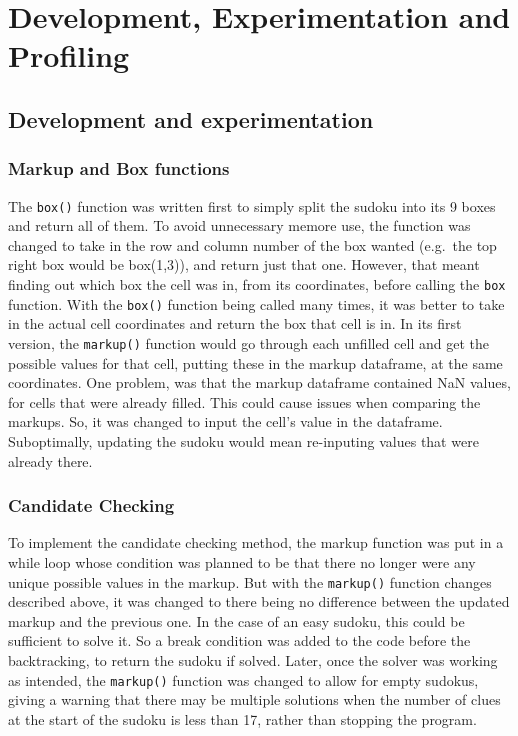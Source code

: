 \documentclass[12pt]{report} %
\begin{document}
\chapter{Development, Experimentation and Profiling}

\section{Development and experimentation}

\subsection{Markup and Box functions}


The \texttt{box()} function was written first to simply split the sudoku into its 9 boxes and return all of them. To avoid unnecessary memore use, the function was changed to take in the row and column number of the box wanted (e.g.\ the top right box would be box(1,3)), and return just that one. However, that meant finding out which box the cell was in, from its coordinates, before calling the \texttt{box} function. With the \texttt{box()} function being called many times, it was better to take in the actual cell coordinates and return the box that cell is in.
In its first version, the \texttt{markup()} function would go through each unfilled cell and get the possible values for that cell, putting these in the markup dataframe, at the same coordinates. One problem, was that the markup dataframe contained NaN values, for cells that were already filled. This could cause issues when comparing the markups. So, it was changed to input the cell's value in the dataframe. Suboptimally, updating the sudoku would mean re-inputing values that were already there.

\subsection{Candidate Checking}

To implement the candidate checking method, the markup function was put in a while loop whose condition was planned to be that there no longer were any unique possible values in the markup. But with the \texttt{markup()} function changes described above, it was changed to there being no difference between the updated markup and the previous one. In the case of an easy sudoku, this could be sufficient to solve it. So a break condition was added to the code before the backtracking, to return the sudoku if solved. Later, once the solver was working as intended, the \texttt{markup()} function was changed to allow for empty sudokus, giving a warning that there may be multiple solutions when the number of clues at the start of the sudoku is less than 17\cite{cornell_sudoku2}, rather than stopping the program.
\end{document}
